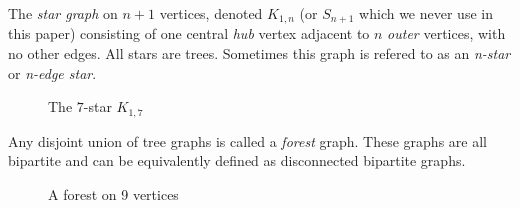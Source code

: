\begin{definition}
The \textit{star graph} on $n+1$ vertices, denoted $K_{1,n}$ (or $S_{n+1}$ which we never use in this paper) consisting of one central \textit{hub} vertex adjacent to $n$ \textit{outer} vertices, with no other edges. All stars are trees. Sometimes this graph is refered to as an \textit{n-star} or \textit{n-edge star}.
\end{definition}

\begin{figure}[H]
    \begin{center}
    \end{center}
    \caption{The $7$-star $K_{1,7}$}
    \label{fig:star-7}
    \end{figure}
    

\begin{definition}

Any disjoint union of tree graphs is called a \textit{forest} graph. These graphs are all bipartite and can be equivalently defined as disconnected bipartite graphs.
\end{definition}

\begin{figure}[H]
    \begin{center}
    \end{center}
    \caption{A forest on 9 vertices}
    \label{fig:star-and-path}
    \end{figure}
    

